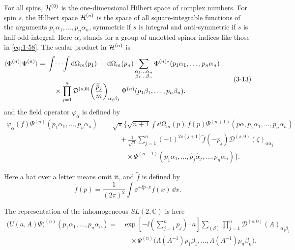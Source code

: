For all spins, $\mathcal{H}^{(0)}$ is the one-dimensional Hilbert space of
complex numbers.  For spin $s$, the Hilbert space $\mathcal{H}^{(n)}$ is the
space of all square-integrable functions of the arguments
$p_1\alpha_1,\ldots,p_n\alpha_n$, symmetric if $s$ is integral and
anti-symmetric if $s$ is half-odd-integral.  Here $\alpha_j$ stands for a
group of undotted spinor indices like those in \eqref{eq:1-58}.  The scalar product
in $\mathcal{H}^{(n)}$ is
\begin{equation}
\begin{aligned}
  \langle \Phi^{(n)}\vert \Psi^{(n)}\rangle={}&
  \int\!\cdots\!\int
  \mathop{}\!\mathrm{d}\Omega_m(p_1)\cdots\mathop{}\!\mathrm{d}\Omega_m(p_n)
  \sum_{\substack{\alpha_1\ldots\alpha_n\\\beta_1\ldots\beta_n}}
  \Phi^{(n)*}(p_1\alpha_1,\ldots,p_n\alpha_n) \\
  &\quad\times\prod_{j=1}^{n}
  \mathcal{D}^{(s,0)}\!\left(\frac{\widetilde p_j}{m}\right)_{\alpha_j\beta_j}
  \Psi^{(n)}(p_1\beta_1,\ldots,p_n\beta_n).
\end{aligned}
\tag{3-13}\label{eq:ch3-free-field-n-particle-product}
\end{equation}
and the field operator $\varphi_\alpha$ is defined by
\begin{equation}
\begin{aligned}
  \varphi_\alpha(f)\Psi^{(n)}(p_1\alpha_1,\ldots,p_n\alpha_n)
  ={ }&\sqrt{\pi}\Biggl\{
  \sqrt{n+1}\int\!\dd\Omega_m(p)\,f(p)
  \Psi^{(n+1)}(p\alpha,p_1\alpha_1,\ldots,p_n\alpha_n) \\
  &\quad+\frac{1}{\sqrt n}\sum_{j=1}^{n}(-1)^{2s(j+1)}
  \widetilde f(-p_j)\mathcal{D}^{(s,0)}(\zeta)_{\alpha\alpha_j} \\
  &\qquad\times\Psi^{(n-1)}(p_1\alpha_1,\ldots,
  \widehat p_j\widehat\alpha_j,\ldots,p_n\alpha_n)\Biggr\}.
\end{aligned}
\tag{3-14}\label{eq:ch3-free-field-operator}
\end{equation}

Here a hat over a letter means omit it, and $\widetilde f$ is defined by
\begin{equation}
  \widetilde f(p)=\frac{1}{(2\pi)^2}\int
  \ee^{+\ii p\cdot x}f(x)\,\dd x.
  \tag{3-15}\label{eq:ch3-fourier-transform}
\end{equation}

The representation of the inhomogeneous $SL(2,\mathbb C)$ is here
\begin{equation}
\begin{aligned}
  \bigl(U(a,A)\Psi\bigr)^{(n)}(p_1\alpha_1,\ldots,p_n\alpha_n)
  ={ }&\exp\!\left[-\ii\left(\sum_{j=1}^{n}p_j\right)\!\cdot a\right]
  \sum_{(\beta)}
  \prod_{j=1}^{n}\mathcal{D}^{(s,0)}(A)_{\alpha_j\beta_j} \\
  &\quad\times\Psi^{(n)}\bigl(\Lambda(A^{-1})p_1\beta_1,\ldots,
  \Lambda(A^{-1})p_n\beta_n\bigr).
\end{aligned}
\tag{3-16}\label{eq:ch3-inhomogeneous-representation}
\end{equation}

